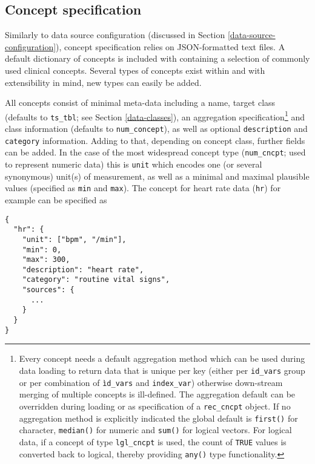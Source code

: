 \documentclass[
  notitle]{jss}
\begin{document}
\hypertarget{concept-specification}{%
\subsection{Concept specification}\label{concept-specification}}

Similarly to data source configuration (discussed in Section
\ref{data-source-configuration}), concept specification relies on
JSON-formatted text files. A default dictionary of concepts is included
with  containing a selection of commonly used clinical
concepts. Several types of concepts exist within  and with
extensibility in mind, new types can easily be added.

All concepts consist of minimal meta-data including a name, target class
(defaults to \texttt{ts\_tbl}; see Section \ref{data-classes}), an
aggregation specification\footnote{Every concept needs a default
  aggregation method which can be used during data loading to return
  data that is unique per key (either per \texttt{id\_vars} group or per
  combination of \texttt{ìd\_vars} and \texttt{index\_var}) otherwise
  down-stream merging of multiple concepts is ill-defined. The
  aggregation default can be overridden during loading or as
  specification of a \texttt{rec\_cncpt} object. If no aggregation
  method is explicitly indicated the global default is \texttt{first()}
  for character, \texttt{median()} for numeric and \texttt{sum()} for
  logical vectors. For logical data, if a concept of type
  \texttt{lgl\_cncpt} is used, the count of \texttt{TRUE} values is
  converted back to logical, thereby providing \texttt{any()} type
  functionality.} and class information (defaults to
\texttt{num\_concept}), as well as optional \texttt{description} and
\texttt{category} information. Adding to that, depending on concept
class, further fields can be added. In the case of the most widespread
concept type (\texttt{num\_cncpt}; used to represent numeric data) this
is \texttt{unit} which encodes one (or several synonymous) unit(s) of
measurement, as well as a minimal and maximal plausible values
(specified as \texttt{min} and \texttt{max}). The concept for heart rate
data (\texttt{hr}) for example can be specified as

\begin{verbatim}
{
  "hr": {
    "unit": ["bpm", "/min"],
    "min": 0,
    "max": 300,
    "description": "heart rate",
    "category": "routine vital signs",
    "sources": {
      ...
    }
  }
}
\end{verbatim}
\end{document}
